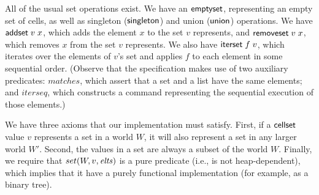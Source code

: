All of the usual set operations exist. We have an $\mathsf{emptyset}$,
representing an empty set of cells, as well as singleton
($\mathsf{singleton}$) and union ($\mathsf{union}$) operations.  We have
$\mathsf{addset}\;v\;x$, which adds the element $x$ to the set $v$
represents, and $\mathsf{removeset}\;v\;x$, which removes $x$ from the
set $v$ represents. We also have $\mathsf{iterset}\;f\;v$, which
iterates over the elements of $v$'s set and applies $f$ to each
element in some sequential order. (Observe that the specification
makes use of two auxiliary predicates: $matches$, which assert that a
set and a list have the same elements; and $iterseq$, which constructs
a command representing the sequential execution of those elements.)

We have three axioms that our implementation must satisfy. First, if a
$\mathsf{cellset}$ value $v$ represents a set in a world $W$, it will also
represent a set in any larger world $W'$. Second, the values in a set
are always a subset of the world $W$. Finally, we require that
$set(W,v,\mathit{elts})$ is a pure predicate (i.e., is not heap-dependent),
which implies that it have a purely functional implementation (for
example, as a binary tree). 

